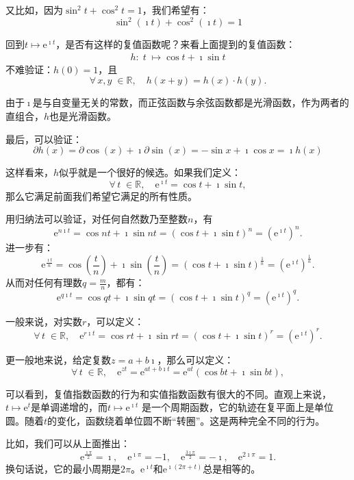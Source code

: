 \documentclass[12pt,UTF8]{ctexbook}
\newcommand{\e}{\mathrm{e}}
\theoremstyle{definition}
\theoremstyle{plain}
\begin{document}
又比如，因为$\sin^2{t} + \cos^2{t} = 1$，我们希望有：
$$ \sin^2{(\imath t)} + \cos^2{(\imath t)} = 1 $$

回到$t\mapsto \e^{\imath t}$，是否有这样的复值函数呢？来看上面提到的复值函数：
\begin{align*}
    h: \;t \;\mapsto \cos{t} + \imath \sin{t}
\end{align*}
不难验证：$h(0) = 1$，且
$$ \forall \, x, y\; \in \mathbb{R}, \quad h(x + y) = h(x)\cdot h(y).$$

由于$\imath$是与自变量无关的常数，而正弦函数与余弦函数都是光滑函数，作为两者的直组合，$h$也是光滑函数。

最后，可以验证：
$$ \partial h(x) = \partial \cos{(x)} + \imath \partial \sin{(x)} = - \sin{x} + \imath \cos{x} = \imath h(x) $$

这样看来，$h$似乎就是一个很好的候选。如果我们定义：
$$ \forall \, t \; \in \mathbb{R}, \quad  \e^{\imath t} = \cos{t} + \imath \sin{t}, $$
那么它满足前面我们希望它满足的所有性质。

用归纳法可以验证，对任何自然数乃至整数$n$，有
$$ \e^{n\imath t} = \cos{nt} + \imath \sin{nt} = (\cos{t} + \imath \sin{t})^n = \left( \e^{\imath t} \right)^n. $$
进一步有：
$$ \e^{\frac{\imath t}{n}} = \cos{\left(\frac{t}{n}\right)} + \imath \sin{\left(\frac{t}{n}\right)} = (\cos{t} + \imath \sin{t})^{\frac{1}{n}} = \left( \e^{\imath t} \right)^{\frac{1}{n}}. $$
从而对任何有理数$q = \frac{m}{n}$，都有：
$$ \e^{q\imath t} = \cos{qt} + \imath \sin{qt} = (\cos{t} + \imath \sin{t})^q = \left( \e^{\imath t} \right)^q. $$

一般来说，对实数$r$，可以定义：
$$ \forall \, t \; \in \mathbb{R}, \quad \e^{r\imath t} = \cos{rt} + \imath \sin{rt} = (\cos{t} + \imath \sin{t})^r = \left( \e^{\imath t} \right)^r. $$

更一般地来说，给定复数$z = a + b\imath$，那么可以定义：
$$ \forall \, t \; \in \mathbb{R}, \quad  \e^{z t} = \e^{at + b\imath t} = \e^{at} \left( \cos{bt} + \imath \sin{bt} \right), $$

可以看到，复值指数函数的行为和实值指数函数有很大的不同。直观上来说，$t\mapsto \e^{t}$是单调递增的，而$t\mapsto \e^{\imath t}$
是一个周期函数，它的轨迹在复平面上是单位圆。随着$t$的变化，函数绕着单位圆不断“转圈”。这是两种完全不同的行为。

比如，我们可以从上面推出：
$$ \e^{\frac{\imath\pi}{2}} = \imath, \quad \e^{\imath\pi} = -1, \quad \e^{\frac{3\imath\pi}{2}} = -\imath, \quad \e^{2\imath\pi} = 1. $$
换句话说，它的最小周期是$2\pi$。$\e^{\imath t}$和$\e^{\imath(2\pi + t)}$总是相等的。
\end{document}
